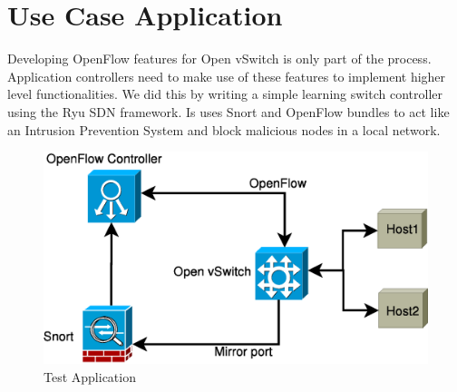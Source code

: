 
\chapter{Use Case Application}
\label{chapter:app}

Developing OpenFlow features for Open vSwitch is only part of the process. Application controllers need to make
use of these features to implement higher level functionalities. We did this by writing a simple learning
switch controller using the Ryu\cite{ryu} SDN framework. Is uses Snort and OpenFlow bundles to act like an Intrusion
Prevention System and block malicious nodes in a local network.

\begin{figure}[h]
\begin{center}
\includegraphics[scale=0.5]{src/img/test-app.eps}
\end{center}
\caption{Test Application}
\label{fig:testapp}
\end{figure}